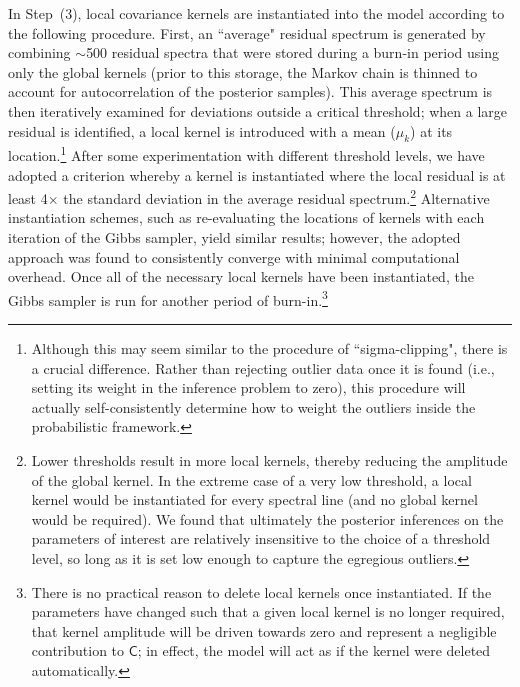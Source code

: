\documentclass[iop,floatfix,numberedappendix,twocolappendix]{emulateapj}
\newcommand{\vC}{\mathsf{C}}
\begin{document}
In Step~(3), local covariance kernels are instantiated into the model according to the following 
procedure.  First, an ``average" residual spectrum is generated by combining $\sim$500 residual 
spectra that were stored during a burn-in period using only the global kernels (prior to this 
storage, the Markov chain is thinned to account for autocorrelation of the posterior samples).  
This average spectrum is then iteratively examined for deviations outside a critical threshold; 
when a large residual is identified, a local kernel is introduced with a mean ($\mu_k$) at its 
location.\footnote{Although this may seem similar to the procedure of ``sigma-clipping", there is a 
crucial difference.  Rather than rejecting outlier data once it is found (i.e., setting its weight 
in the inference problem to zero), this procedure will actually self-consistently determine how to 
weight the outliers inside the probabilistic framework.}  After some experimentation with different 
threshold levels, we have adopted a criterion whereby a kernel is instantiated where the local 
residual is at least 4$\times$ the standard deviation in the average residual 
spectrum.\footnote{Lower thresholds result in more local kernels, thereby reducing the amplitude of 
the global kernel.  In the extreme case of a very low threshold, a local kernel would be 
instantiated for every spectral line (and no global kernel would be required).  We found that 
ultimately the posterior inferences on the parameters of interest are relatively insensitive to the 
choice of a threshold level, so long as it is set low enough to capture the egregious outliers.}  
Alternative instantiation schemes, such as re-evaluating the locations of kernels with each 
iteration of the Gibbs sampler, yield similar results; however, the adopted approach was found to 
consistently converge with minimal computational overhead.  Once all of the necessary local kernels 
have been instantiated, the Gibbs sampler is run for another period of burn-in.\footnote{There is 
no practical reason to delete local kernels once instantiated.  If the parameters have changed such 
that a given local kernel is no longer required, that kernel amplitude will be driven towards zero 
and represent a negligible contribution to $\vC$; in effect, the model will act as if the kernel 
were deleted automatically.}
\end{document}

